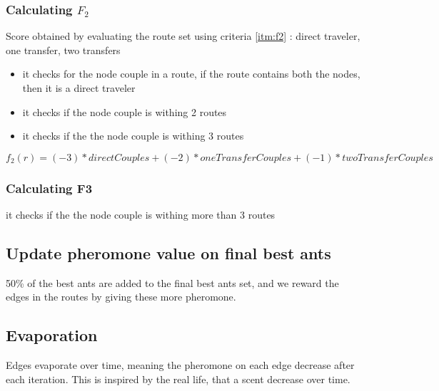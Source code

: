 \subsubsection{Calculating $F_{2}$}
Score obtained by evaluating the route set using criteria \ref{itm:f2} : direct traveler, one transfer, two transfers


\begin{itemize}
\item it checks for the node couple in a route, if the route contains both the nodes, then it is a direct traveler
\item it checks if the node couple is withing 2 routes
\item it checks if the the node couple is withing 3 routes
\end{itemize}

$f_2(r) = (-3) * directCouples + (-2) * oneTransferCouples + (-1) * twoTransferCouples $

\subsubsection{Calculating F3}
it checks if the the node couple is withing more than 3 routes


\subsection{Update pheromone value on final best ants}

\begin{algorithm}[H]
\end{algorithm}

50\% of the best ants are added to the final best ants set, and we reward the edges in the routes by giving these more pheromone.

\subsection{Evaporation}

\begin{algorithm}[H]
\end{algorithm}

Edges evaporate over time, meaning the pheromone on each edge decrease after each iteration. This is inspired by the real life, that a scent decrease over time.


